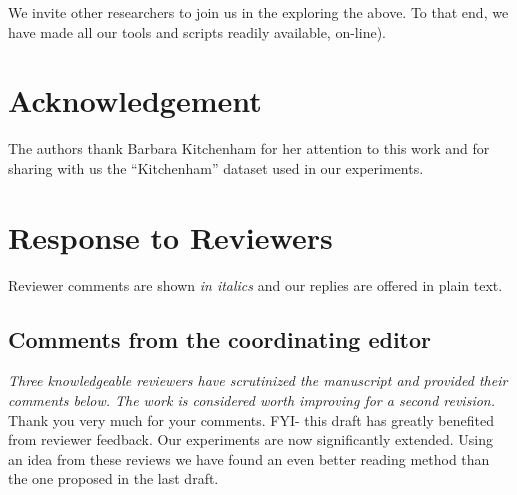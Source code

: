 \documentclass{svjour3}
\theoremstyle{break}
\newcommand{\review}[1]{{\textit{#1}}~\\}
\begin{document}
 We invite other researchers to join us in the exploring the above. To that end, we have made all our tools and scripts readily available, on-line).


\section*{Acknowledgement}
The authors thank Barbara Kitchenham for
her attention to this work and for
sharing with us the ``Kitchenham'' dataset used in our experiments.
 
% 

 






\appendix 


\newpage
\section*{Response to Reviewers}

Reviewer comments are shown {\em in italics} and our replies
are offered in plain text.

\subsection*{Comments from the coordinating editor}

\review{Three knowledgeable reviewers have scrutinized the manuscript and provided their comments below. The work is considered worth improving for a second revision.}

Thank you very much for your comments. FYI- this draft has greatly benefited from reviewer feedback. Our experiments are now significantly
extended. Using an idea from these reviews we have found an even better reading method than the one proposed in the last draft. 
\par~
\end{document}
